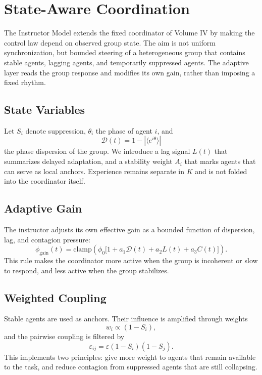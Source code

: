 \section{State-Aware Coordination}

The Instructor Model extends the fixed coordinator of Volume IV by making the control law depend on observed group state. The aim is not uniform synchronization, but bounded steering of a heterogeneous group that contains stable agents, lagging agents, and temporarily suppressed agents. The adaptive layer reads the group response and modifies its own gain, rather than imposing a fixed rhythm.

\subsection{State Variables}
Let $S_i$ denote suppression, $\theta_i$ the phase of agent $i$, and
\begin{equation}
\mathcal{D}(t)=1-\left|\langle e^{i\theta}\rangle\right|
\end{equation}
the phase dispersion of the group. We introduce a lag signal $L(t)$ that summarizes delayed adaptation, and a stability weight $A_i$ that marks agents that can serve as local anchors. Experience remains separate in $K$ and is not folded into the coordinator itself.

\subsection{Adaptive Gain}
The instructor adjusts its own effective gain as a bounded function of dispersion, lag, and contagion pressure:
\begin{equation}
\phi_{\mathrm{gain}}(t)=\mathrm{clamp}\!\left(\phi_0\bigl[1+a_1\mathcal{D}(t)+a_2L(t)+a_3C(t)\bigr]\right).
\end{equation}
This rule makes the coordinator more active when the group is incoherent or slow to respond, and less active when the group stabilizes.

\subsection{Weighted Coupling}
Stable agents are used as anchors. Their influence is amplified through weights
\begin{equation}
w_i \propto (1-S_i),
\end{equation}
and the pairwise coupling is filtered by
\begin{equation}
\varepsilon_{ij}=\varepsilon(1-S_i)(1-S_j).
\end{equation}
This implements two principles: give more weight to agents that remain available to the task, and reduce contagion from suppressed agents that are still collapsing.

